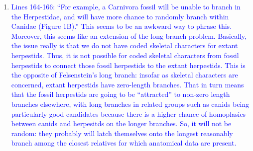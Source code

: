 \documentclass[12pt,letterpaper]{article}
\begin{document}
\begin{enumerate}
\item{\textcolor{blue}{Lines 164-166: ``For example, a Carnivora fossil will be unable to branch in the Herpestidae, and will have more chance to randomly branch within Canidae (Figure 1B).'' 
This seems to be an awkward way to phrase this.
Moreover, this seems like an extension of the long-branch problem.
Basically, the issue really is that we do not have coded skeletal characters for extant herpestids.
Thus, it is not possible for coded skeletal characters from fossil herpestids to connect those fossil herpestids to the extant herpestids.
This is the opposite of Felsenstein's long branch: insofar as skeletal characters are concerned, extant herpestids have zero-length branches.
That in turn means that the fossil herpestids are going to be ``attracted'' to non-zero length branches elsewhere, with long branches in related groups such as canids being particularly good candidates because there is a higher chance of homoplasies between canids and herpesitds on the longer branches.
So, it will not be random: they probably will latch themselves onto the longest reasonably branch among the closest relatives for which anatomical data are present.}}


\end{enumerate}

\end{document}
